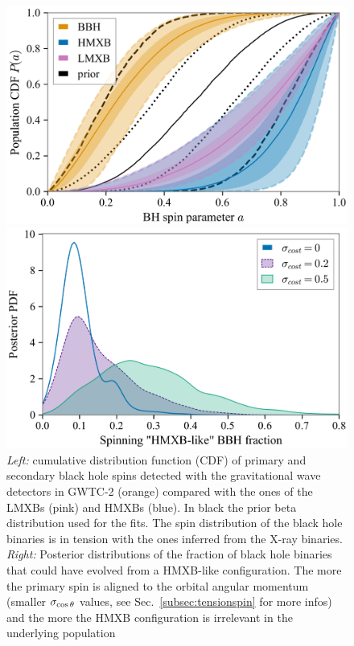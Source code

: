 \documentclass[a4paper,titlepage]{book}     	%
\begin{document}
\begin{figure}
	\begin{minipage}{.49\textwidth}
		\centering
		\includegraphics[width=\textwidth]{./images/tensionspin.png}
	\end{minipage}
	\hfill
	\begin{minipage}{.49\textwidth}
		\vspace{.5mm}
		\centering
		\includegraphics[width=\textwidth]{./images/tensionspinHMXBHlike.png}	
	\end{minipage}
	\caption{\emph{Left:} cumulative distribution function (CDF) of primary and secondary black hole spins detected with the gravitational wave detectors in GWTC-2 (orange) compared with the ones of the LMXBs (pink) and HMXBs (blue). In black the prior beta distribution used for the fits. The spin distribution of the black hole binaries is in tension with the ones inferred from the X-ray binaries. \emph{Right:} Posterior distributions of the fraction of black hole binaries that could have evolved from a HMXB-like configuration. The more the primary spin is aligned to the orbital angular momentum (smaller $\sigma_{\rm \cos \theta}$ values, see Sec.\ \ref{subsec:tensionspin} for more infos) and the more the HMXB configuration is irrelevant in the underlying population \cite{HMXBH_spins2021}}\label{fig:tensionspin}
\end{figure}
\end{document}
